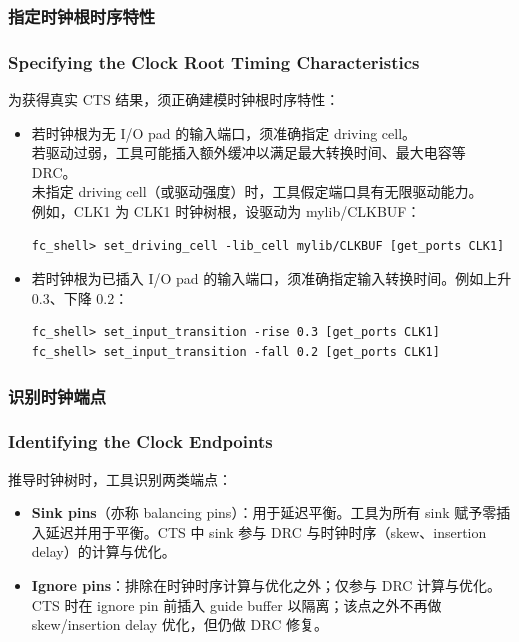 \subsubsection{指定时钟根时序特性}
\subsubsection*{Specifying the Clock Root Timing Characteristics}

为获得真实 CTS 结果，须正确建模时钟根时序特性：
\begin{itemize}
  \item 若时钟根为无 I/O pad 的输入端口，须准确指定 driving cell。\\
        若驱动过弱，工具可能插入额外缓冲以满足最大转换时间、最大电容等 DRC。\\
        未指定 driving cell（或驱动强度）时，工具假定端口具有无限驱动能力。\\
        例如，CLK1 为 CLK1 时钟树根，设驱动为 mylib/CLKBUF：
\begin{lstlisting}
fc_shell> set_driving_cell -lib_cell mylib/CLKBUF [get_ports CLK1]
\end{lstlisting}
  \item 若时钟根为已插入 I/O pad 的输入端口，须准确指定输入转换时间。例如上升 0.3、下降 0.2：
\begin{lstlisting}
fc_shell> set_input_transition -rise 0.3 [get_ports CLK1]
fc_shell> set_input_transition -fall 0.2 [get_ports CLK1]
\end{lstlisting}
\end{itemize}

\subsubsection{识别时钟端点}
\subsubsection*{Identifying the Clock Endpoints}

推导时钟树时，工具识别两类端点：
\begin{itemize}
  \item \textbf{Sink pins}（亦称 balancing pins）：用于延迟平衡。工具为所有 sink 赋予零插入延迟并用于平衡。CTS 中 sink 参与 DRC 与时钟时序（skew、insertion delay）的计算与优化。
  \item \textbf{Ignore pins}：排除在时钟时序计算与优化之外；仅参与 DRC 计算与优化。CTS 时在 ignore pin 前插入 guide buffer 以隔离；该点之外不再做 skew/insertion delay 优化，但仍做 DRC 修复。
\end{itemize}

